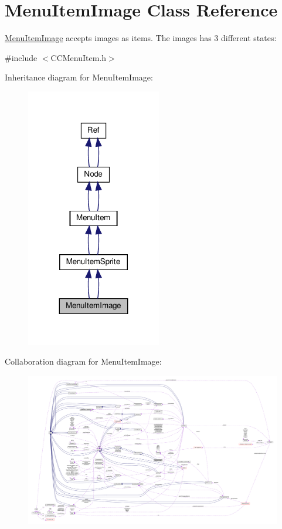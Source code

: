 \hypertarget{classMenuItemImage}{}\section{Menu\+Item\+Image Class Reference}
\label{classMenuItemImage}


\hyperlink{classMenuItemImage}{Menu\+Item\+Image} accepts images as items. The images has 3 different states\+:  




{\ttfamily \#include $<$C\+C\+Menu\+Item.\+h$>$}



Inheritance diagram for Menu\+Item\+Image\+:
\nopagebreak
\begin{figure}[H]
\begin{center}
\leavevmode
\includegraphics[width=167pt]{classMenuItemImage__inherit__graph}
\end{center}
\end{figure}


Collaboration diagram for Menu\+Item\+Image\+:
\nopagebreak
\begin{figure}[H]
\begin{center}
\leavevmode
\includegraphics[width=350pt]{classMenuItemImage__coll__graph}
\end{center}
\end{figure}
